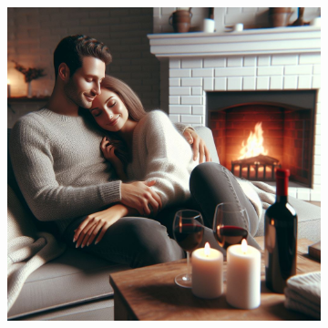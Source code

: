 \documentclass[a4paper,10pt,english]{article}
\begin{document}
\begin{figure}[h]
\begin{subfigure}{0.29\linewidth}
\label{Fig:Style1B}
\end{subfigure}\hfill
%
\begin{subfigure}{0.29\linewidth}
\includegraphics[width=\linewidth]{figC}
\label{Fig:Style1C}
\end{subfigure}

\end{figure}
\end{document}
